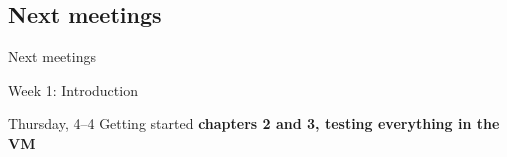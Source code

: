 \subsection{Next meetings}
\begin{frame}
Next meetings
\end{frame}


\begin{frame}{Week 1: Introduction}

\begin{block}{Thursday, 4--4}
Getting started
\textbf{chapters 2 and 3, testing everything in the VM}

\end{block}


\end{frame}
%
%
%
%
%
%	
%	
%
%




